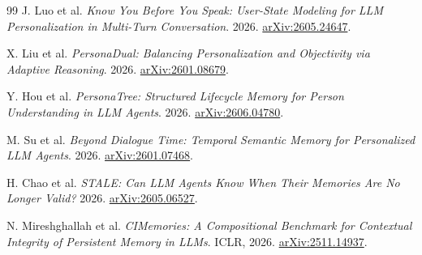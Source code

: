 \documentclass[10.5pt,a4paper]{article}
\begin{document}
\begin{thebibliography}{99}
J. Luo et al. \emph{Know You Before You Speak: User-State Modeling for LLM Personalization in Multi-Turn Conversation}. 2026. \href{https://arxiv.org/abs/2605.24647}{arXiv:2605.24647}.

X. Liu et al. \emph{PersonaDual: Balancing Personalization and Objectivity via Adaptive Reasoning}. 2026. \href{https://arxiv.org/abs/2601.08679}{arXiv:2601.08679}.

Y. Hou et al. \emph{PersonaTree: Structured Lifecycle Memory for Person Understanding in LLM Agents}. 2026. \href{https://arxiv.org/abs/2606.04780}{arXiv:2606.04780}.

M. Su et al. \emph{Beyond Dialogue Time: Temporal Semantic Memory for Personalized LLM Agents}. 2026. \href{https://arxiv.org/abs/2601.07468}{arXiv:2601.07468}.

H. Chao et al. \emph{STALE: Can LLM Agents Know When Their Memories Are No Longer Valid?} 2026. \href{https://arxiv.org/abs/2605.06527}{arXiv:2605.06527}.

N. Mireshghallah et al. \emph{CIMemories: A Compositional Benchmark for Contextual Integrity of Persistent Memory in LLMs}. ICLR, 2026. \href{https://arxiv.org/abs/2511.14937}{arXiv:2511.14937}.

\end{thebibliography}
\end{document}
